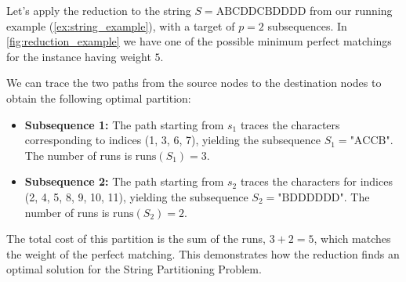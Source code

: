 \begin{example} \label{ex:reduction_ex}
    Let's apply the reduction to the string $S = \text{ABCDDCBDDDD}$ from our running example (\cref{ex:string_example}), with a target of $p=2$ subsequences. In \cref{fig:reduction_example} we have one of the possible minimum perfect matchings for the instance having weight $5$. 
    
    We can trace the two paths from the source nodes to the destination nodes to obtain the following optimal partition:
    \begin{itemize}
        \item \textbf{Subsequence 1:} The path starting from $s_1$ traces the characters corresponding to indices (1, 3, 6, 7), yielding the subsequence $S_1 = \text{"ACCB"}$. The number of runs is $\text{runs}(S_1) = 3$.
        \item \textbf{Subsequence 2:} The path starting from $s_2$ traces the characters for indices (2, 4, 5, 8, 9, 10, 11), yielding the subsequence $S_2 = \text{"BDDDDDD"}$. The number of runs is $\text{runs}(S_2) = 2$.
    \end{itemize}
    The total cost of this partition is the sum of the runs, $3 + 2 = 5$, which matches the weight of the perfect matching. This demonstrates how the reduction finds an optimal solution for the String Partitioning Problem.

    \begin{figure}[H]
        \centering
\end{figure}
\end{example}
